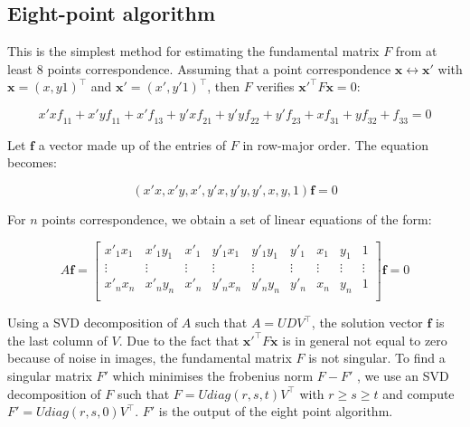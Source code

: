 \documentclass[11pt]{report}
\begin{document}
\subsection{Eight-point algorithm \cite{Geom}}

This is the simplest method for estimating the fundamental matrix $F$ from at least 8 points correspondence. Assuming that a point correspondence $\mathbf{x} \leftrightarrow \mathbf{x}'$ with $\mathbf{x} = (x, y 1)^\top$ and $\mathbf{x}' = (x', y' 1)^\top$, then $F$ verifies $\mathbf{x}'^\top F\mathbf{x} = 0$:

\[
    x'x\mathit{f}_{11} + x'y\mathit{f}_{11} + x'\mathit{f}_{13} + y'x\mathit{f}_{21} + y'y\mathit{f}_{22} + y'\mathit{f}_{23} + x\mathit{f}_{31} + y\mathit{f}_{32} + \mathit{f}_{33} = 0
\]

Let $\mathbf{f}$ a vector made up of the entries of $F$ in row-major order. The equation becomes:

\[
(x'x, x'y, x', y'x, y'y, y', x, y, 1)\mathbf{f} = 0
\]

For $n$ points correspondence, we obtain a set of linear equations of the form:

\[
    A\mathbf{f} = 
\left [
  \begin{array}{ccccccccc}
    x'_1x_1 & x'_1y_1 & x'_1 & y'_1x_1 & y'_1y_1 & y'_1 & x_1 & y_1 & 1 \\
    \vdots & \vdots & \vdots & \vdots & \vdots & \vdots & \vdots & \vdots & \vdots \\
    x'_nx_n & x'_ny_n & x'_n & y'_nx_n & y'_ny_n & y'_n & x_n & y_n & 1 \\
  \end{array}
\right ] 
\mathbf{f} = 0
\]

Using a SVD decomposition of $A$ such that $A = UDV^\top$, the solution vector $\mathbf{f}$ is the last column of $V$.
Due to the fact that $\mathbf{x}'^\top F\mathbf{x}$ is in general not equal to zero because of noise in images, the fundamental matrix $F$ is not singular. To find a singular matrix $F'$ which minimises the frobenius norm $F - F'$ , we use an SVD decomposition of $F$ such that $F = Udiag(r, s, t)V^\top$ with $r \geq s \geq t$ and compute $F' = Udiag(r, s, 0)V^\top$. $F'$ is the output of the eight point algorithm.
\end{document}
